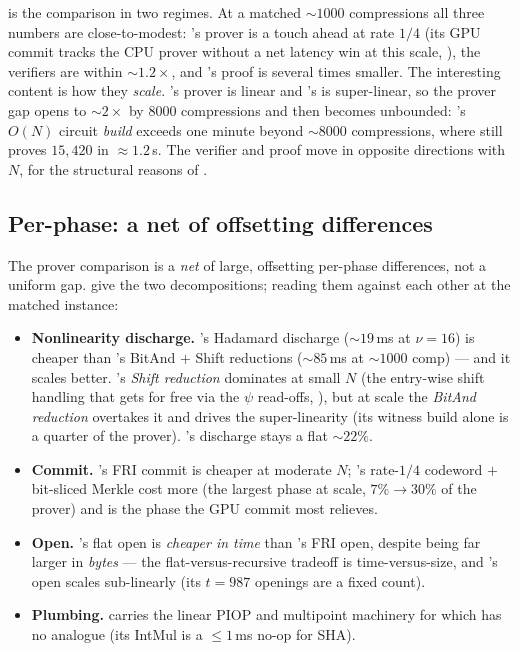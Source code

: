  is the comparison in two regimes. At a matched
$\sim$$1000$ compressions all three numbers are close-to-modest: \zinc{}'s
prover is a touch ahead at rate $1/4$ (its GPU commit tracks the CPU prover
without a net latency win at this scale, ), the
verifiers are within $\sim$$1.2\times$, and \binius{}'s proof is several
times smaller. The interesting content is how they \emph{scale}. \zinc{}'s
prover is linear and \binius{}'s is super-linear, so the prover gap opens to
$\sim$$2\times$ by $8000$ compressions and then becomes unbounded: \binius{}'s
$O(N)$ circuit \emph{build} exceeds one minute beyond $\sim$$8000$
compressions, where \zinc{} still proves $15{,}420$ in $\approx 1.2$\,s. The
verifier and proof move in opposite directions with $N$, for the structural
reasons of .

\subsection{Per-phase: a net of offsetting differences}
\label{sec:res-phases}

The prover comparison is a \emph{net} of large, offsetting per-phase
differences, not a uniform gap.  give the
two decompositions; reading them against each other at the matched instance:

\begin{itemize}
  \item \textbf{Nonlinearity discharge.} \zinc{}'s Hadamard discharge
  ($\sim$$19$\,ms at $\nu{=}16$) is cheaper than \binius{}'s BitAnd $+$ Shift
  reductions ($\sim$$85$\,ms at $\sim$$1000$ comp) --- and it scales better.
  \binius{}'s \emph{Shift reduction} dominates at small $N$ (the entry-wise
  shift handling that \zinc{} gets for free via the $\psi$ read-offs,
  ), but at scale the \emph{BitAnd reduction} overtakes it and
  drives the super-linearity (its witness build alone is a quarter of the
  \binius{} prover). \zinc{}'s discharge stays a flat $\sim$$22\%$.
  \item \textbf{Commit.} \binius{}'s FRI commit is cheaper at moderate $N$;
  \zinc{}'s rate-$1/4$ codeword $+$ bit-sliced Merkle cost more (the largest
  \zinc{} phase at scale, $7\%\!\to\!30\%$ of the prover) and is the phase the
  GPU commit most relieves.
  \item \textbf{Open.} \zinc{}'s flat open is \emph{cheaper in time} than
  \binius{}'s FRI open, despite being far larger in \emph{bytes} --- the
  flat-versus-recursive tradeoff is time-versus-size, and \zinc{}'s open scales
  sub-linearly (its $t=987$ openings are a fixed count).
  \item \textbf{Plumbing.} \zinc{} carries the linear PIOP and multipoint
  machinery for which \binius{} has no analogue (its IntMul is a $\le\!1$\,ms
  no-op for SHA).
\end{itemize}

